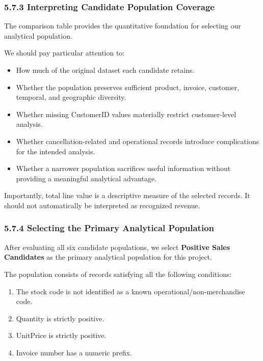 \documentclass[11pt]{article}
\providecommand{\tightlist}{%
      \setlength{\itemsep}{0pt}\setlength{\parskip}{0pt}}
\begin{document}
    
    \subsubsection{5.7.3 Interpreting Candidate Population
Coverage}\label{interpreting-candidate-population-coverage}

The comparison table provides the quantitative foundation for selecting
our analytical population.

We should pay particular attention to:

\begin{itemize}
\tightlist
\item
  How much of the original dataset each candidate retains.
\item
  Whether the population preserves sufficient product, invoice,
  customer, temporal, and geographic diversity.
\item
  Whether missing CustomerID values materially restrict customer-level
  analysis.
\item
  Whether cancellation-related and operational records introduce
  complications for the intended analysis.
\item
  Whether a narrower population sacrifices useful information without
  providing a meaningful analytical advantage.
\end{itemize}

Importantly, total line value is a descriptive measure of the selected
records. It should not automatically be interpreted as recognized
revenue.

    \subsubsection{5.7.4 Selecting the Primary Analytical
Population}\label{selecting-the-primary-analytical-population}

After evaluating all six candidate populations, we select
\textbf{Positive Sales Candidates} as the primary analytical population
for this project.

The population consists of records satisfying all the following
conditions:

\begin{enumerate}
\def\labelenumi{\arabic{enumi}.}
\tightlist
\item
  The stock code is not identified as a known
  operational/non-merchandise code.
\item
  Quantity is strictly positive.
\item
  UnitPrice is strictly positive.
\item
  Invoice number has a numeric prefix.
\end{enumerate}
\end{document}
